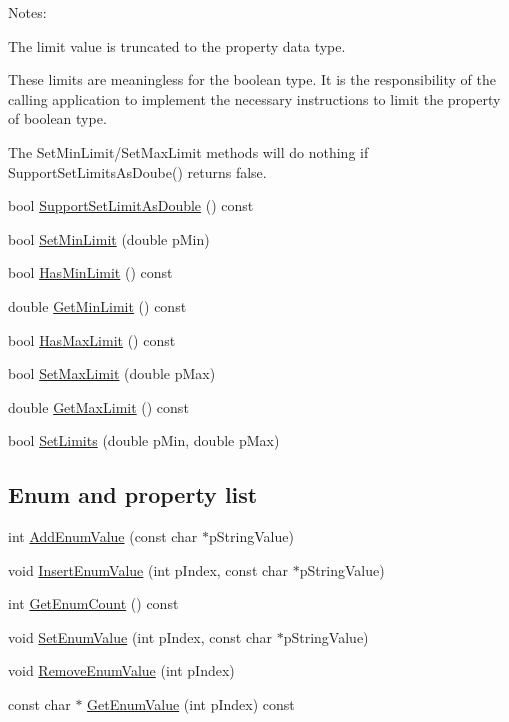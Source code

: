 Notes\+:
\begin{DoxyItemize}
\item The limit value is truncated to the property data type.
\item These limits are meaningless for the boolean type. It is the responsibility of the calling application to implement the necessary instructions to limit the property of boolean type.
\item The Set\+Min\+Limit/\+Set\+Max\+Limit methods will do nothing if Support\+Set\+Limits\+As\+Doube() returns false. 
\end{DoxyItemize}\begin{DoxyCompactItemize}
\item 
bool \hyperlink{class_fbx_property_a7f84a31a453f4e800e4440517418e7fe}{Support\+Set\+Limit\+As\+Double} () const
\item 
bool \hyperlink{class_fbx_property_aa257615c70fd0ff635471216d8aea3ca}{Set\+Min\+Limit} (double p\+Min)
\item 
bool \hyperlink{class_fbx_property_ae2c3f0688ecfbed568feb2dbe33967c3}{Has\+Min\+Limit} () const
\item 
double \hyperlink{class_fbx_property_abdc5ccbaea5c1e32d7b1ccfa3fd826af}{Get\+Min\+Limit} () const
\item 
bool \hyperlink{class_fbx_property_a0f55c44acd2069128f85063eb2c04d47}{Has\+Max\+Limit} () const
\item 
bool \hyperlink{class_fbx_property_af79f0aa4871176b7ca40e16af233a984}{Set\+Max\+Limit} (double p\+Max)
\item 
double \hyperlink{class_fbx_property_a1cdf4161465d3b988b23b9fe05fa22b4}{Get\+Max\+Limit} () const
\item 
bool \hyperlink{class_fbx_property_acc29ebadc04e2fdd89f986d3faaff874}{Set\+Limits} (double p\+Min, double p\+Max)
\end{DoxyCompactItemize}
\subsection*{Enum and property list}
\begin{DoxyCompactItemize}
\item 
int \hyperlink{class_fbx_property_aa25239a939eb238e2eb239040364e286}{Add\+Enum\+Value} (const char $\ast$p\+String\+Value)
\item 
void \hyperlink{class_fbx_property_a3e03482059d70c4e86314f8922ae8d22}{Insert\+Enum\+Value} (int p\+Index, const char $\ast$p\+String\+Value)
\item 
int \hyperlink{class_fbx_property_ac06caf332b2d662a8ad09cff1f397820}{Get\+Enum\+Count} () const
\item 
void \hyperlink{class_fbx_property_ae9dd7a699742397756227ac1dbd9eb13}{Set\+Enum\+Value} (int p\+Index, const char $\ast$p\+String\+Value)
\item 
void \hyperlink{class_fbx_property_aa652adeb57fa64c60cab63ac1df9efa5}{Remove\+Enum\+Value} (int p\+Index)
\item 
const char $\ast$ \hyperlink{class_fbx_property_ab378e2225ba43c225625f137e48808d5}{Get\+Enum\+Value} (int p\+Index) const
\end{DoxyCompactItemize}
